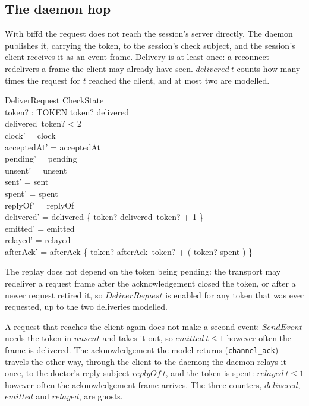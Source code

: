 \documentclass[a4paper,10pt,fleqn]{article}
\begin{document}
\subsection{The daemon hop}

With biffd the request does not reach the session's server directly.  The
daemon publishes it, carrying the token, to the session's check subject, and the
session's client receives it as an event frame.  Delivery is at least once: a
reconnect redelivers a frame the client may already have seen.  $delivered~t$
counts how many times the request for $t$ reached the client, and at most two are
modelled.

\begin{schema}{DeliverRequest}
  \Delta CheckState \\
  token? : TOKEN
\where
  token? \in \dom delivered \\
  delivered~token? < 2 \\
  clock' = clock \\
  acceptedAt' = acceptedAt \\
  pending' = pending \\
  unsent' = unsent \\
  sent' = sent \\
  spent' = spent \\
  replyOf' = replyOf \\
  delivered' = delivered \oplus \{ token? \mapsto delivered~token? + 1 \} \\
  emitted' = emitted \\
  relayed' = relayed \\
  afterAck' = afterAck \oplus \{ token? \mapsto afterAck~token? +
    ( \IF token? \in spent   ) \}
\end{schema}

The replay does not depend on the token being pending: the transport may redeliver
a request frame after the acknowledgement closed the token, or after a newer
request retired it, so $DeliverRequest$ is enabled for any token that was ever
requested, up to the two deliveries modelled.

A request that reaches the client again does not make a second event: $SendEvent$
needs the token in $unsent$ and takes it out, so $emitted~t \leq 1$ however
often the frame is delivered.  The acknowledgement the model returns
(\texttt{channel\_ack}) travels the other way, through the client to the daemon;
the daemon relays it once, to the doctor's reply subject $replyOf~t$, and the
token is spent: $relayed~t \leq 1$ however often the acknowledgement frame
arrives.  The three counters, $delivered$, $emitted$ and $relayed$, are ghosts.
\end{document}
